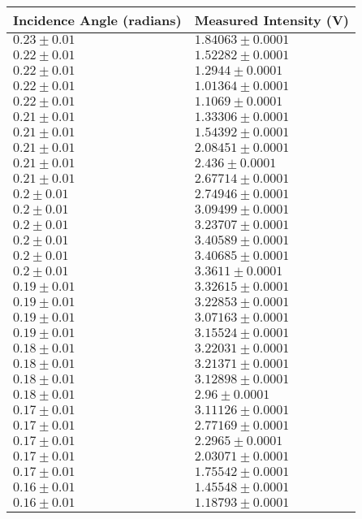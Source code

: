 \begin{tabular}{| p{} | p{} |}
\hline
Incidence Angle (radians) & Measured Intensity (V)\\
\hline
$0.23 \pm 0.01$ & $1.84063 \pm 0.0001$\\
$0.22 \pm 0.01$ & $1.52282 \pm 0.0001$\\
$0.22 \pm 0.01$ & $1.2944 \pm 0.0001$\\
$0.22 \pm 0.01$ & $1.01364 \pm 0.0001$\\
$0.22 \pm 0.01$ & $1.1069 \pm 0.0001$\\
$0.21 \pm 0.01$ & $1.33306 \pm 0.0001$\\
$0.21 \pm 0.01$ & $1.54392 \pm 0.0001$\\
$0.21 \pm 0.01$ & $2.08451 \pm 0.0001$\\
$0.21 \pm 0.01$ & $2.436 \pm 0.0001$\\
$0.21 \pm 0.01$ & $2.67714 \pm 0.0001$\\
$0.2 \pm 0.01$ & $2.74946 \pm 0.0001$\\
$0.2 \pm 0.01$ & $3.09499 \pm 0.0001$\\
$0.2 \pm 0.01$ & $3.23707 \pm 0.0001$\\
$0.2 \pm 0.01$ & $3.40589 \pm 0.0001$\\
$0.2 \pm 0.01$ & $3.40685 \pm 0.0001$\\
$0.2 \pm 0.01$ & $3.3611 \pm 0.0001$\\
$0.19 \pm 0.01$ & $3.32615 \pm 0.0001$\\
$0.19 \pm 0.01$ & $3.22853 \pm 0.0001$\\
$0.19 \pm 0.01$ & $3.07163 \pm 0.0001$\\
$0.19 \pm 0.01$ & $3.15524 \pm 0.0001$\\
$0.18 \pm 0.01$ & $3.22031 \pm 0.0001$\\
$0.18 \pm 0.01$ & $3.21371 \pm 0.0001$\\
$0.18 \pm 0.01$ & $3.12898 \pm 0.0001$\\
$0.18 \pm 0.01$ & $2.96 \pm 0.0001$\\
$0.17 \pm 0.01$ & $3.11126 \pm 0.0001$\\
$0.17 \pm 0.01$ & $2.77169 \pm 0.0001$\\
$0.17 \pm 0.01$ & $2.2965 \pm 0.0001$\\
$0.17 \pm 0.01$ & $2.03071 \pm 0.0001$\\
$0.17 \pm 0.01$ & $1.75542 \pm 0.0001$\\
$0.16 \pm 0.01$ & $1.45548 \pm 0.0001$\\
$0.16 \pm 0.01$ & $1.18793 \pm 0.0001$\\
\hline
\end{tabular}\\
